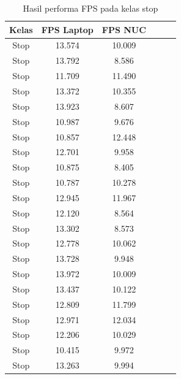 \begin{longtable}{|c|c|c|c|c|c|}
  \caption{Hasil performa FPS pada kelas stop}
  \label{tb:fpsstop} \\
  \hline
  \rowcolor[HTML]{C0C0C0} 
  \textbf{Kelas} & \textbf{FPS Laptop} & \textbf{FPS NUC} \\ \hline
  Stop           & 13.574              & 10.009           \\ \hline
  Stop           & 13.792              & 8.586            \\ \hline
  Stop           & 11.709              & 11.490           \\ \hline
  Stop           & 13.372              & 10.355           \\ \hline
  Stop           & 13.923              & 8.607            \\ \hline
  Stop           & 10.987              & 9.676            \\ \hline
  Stop           & 10.857              & 12.448           \\ \hline
  Stop           & 12.701              & 9.958            \\ \hline
  Stop           & 10.875              & 8.405            \\ \hline
  Stop           & 10.787              & 10.278           \\ \hline
  Stop           & 12.945              & 11.967           \\ \hline
  Stop           & 12.120              & 8.564            \\ \hline
  Stop           & 13.302              & 8.573            \\ \hline
  Stop           & 12.778              & 10.062           \\ \hline
  Stop           & 13.728              & 9.948            \\ \hline
  Stop           & 13.972              & 10.009           \\ \hline
  Stop           & 13.437              & 10.122           \\ \hline
  Stop           & 12.809              & 11.799           \\ \hline
  Stop           & 12.971              & 12.034           \\ \hline
  Stop           & 12.206              & 10.029           \\ \hline
  Stop           & 10.415              & 9.972            \\ \hline
  Stop           & 13.263              & 9.994            \\ \hline

\end{longtable}
